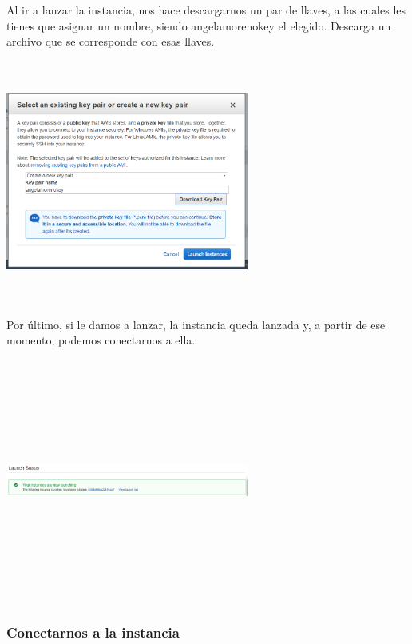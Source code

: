 \documentclass[english,runningheads,a4paper]{llncs}[2018/03/10]
\newenvironment{nscenter}
 {\parskip=0pt\par\nopagebreak\centering}
 {\par\noindent\ignorespacesafterend}
\begin{document}
\newline
Al ir a lanzar la instancia, nos hace descargarnos un par de llaves, a las 
cuales les tienes que asignar un nombre, siendo angelamorenokey el elegido. 
Descarga un archivo que se corresponde con esas llaves.
\newline
\begin{nscenter}
\includegraphics[width=8cm,height=8cm,keepaspectratio]{./Contenedores/AWS/35.png}
\end{nscenter}
\newline
Por último, si le damos a lanzar, la instancia queda lanzada y, a partir de ese 
momento, podemos conectarnos a ella.
\newline
\begin{nscenter}
\includegraphics[width=8cm,height=8cm,keepaspectratio]{./Contenedores/AWS/36.png}
\end{nscenter}
\newline
\subsubsection*{Conectarnos a la instancia}
\end{document}
